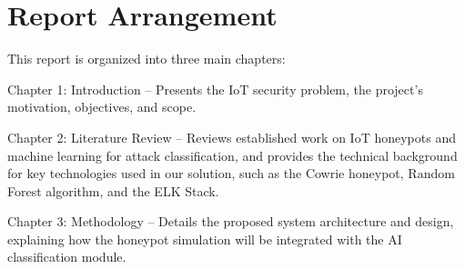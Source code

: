 \section{Report Arrangement}
\label{sec:report_arrangement}

This report is organized into three main chapters:

Chapter 1: Introduction – Presents the IoT security problem, the project's motivation, objectives, and scope.

Chapter 2: Literature Review – Reviews established work on IoT honeypots and machine learning for attack classification, and provides the technical background for key technologies used in our solution, such as the Cowrie honeypot, Random Forest algorithm, and the ELK Stack.

Chapter 3: Methodology – Details the proposed system architecture and design, explaining how the honeypot simulation will be integrated with the AI classification module.
